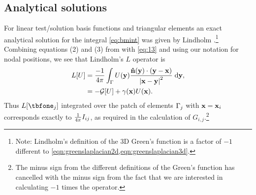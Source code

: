 \subsection{Analytical solutions}

\newcommand{\svu}{\unitv{s}}
\newcommand{\rvu}{\unitv{r}}

For linear test/solution basis functions and triangular elements an exact analytical solution for the integral \cref{eq:bmint} was given by Lindholm \cite[App. B]{Lindholm1984}.\footnote{Note: Lindholm's definition of the 3D Green's function is a factor of $-1$ different to \cref{eqn:greenslaplacian2d,eqn:greenslaplacian3d}.}
Combining equations (2) and (3) from \cite{Lindholm1984} with \cref{eq:13} and using our notation for nodal positions, we see that Lindholm's $L$ operator is
\begin{equation}
  \begin{aligned}
    L[U] &= \frac{-1}{4 \pi}\int_{\Gamma} U(\boldsymbol{\mathrm{y}}) \frac{\boldsymbol{\mathrm{\hat{n}}}(\boldsymbol{\mathrm{y}}) \cdot (\boldsymbol{\mathrm{y}} -
      \boldsymbol{\mathrm{x}})}{\left|{\boldsymbol{\mathrm{x}} - \boldsymbol{\mathrm{y}}} \right|^2}
    {\; \mathrm{{d}}}\boldsymbol{\mathrm{y}}, \\
    &= -\mathcal{G}[U] + \gamma(\boldsymbol{\mathrm{x}}) U(\boldsymbol{\mathrm{x}}).
  \end{aligned}
\end{equation}
Thus $L[\tbfone_{\ibasisb}]$ integrated over the patch of elements ${\Gamma}_{j}$ with $\boldsymbol{\mathrm{x}} = \boldsymbol{\mathrm{x}}_{i}$ corresponds exactly to $\frac{1}{4\pi}I_{ij}$, as required in the calculation of $G_{i,j}$.\footnote{The minus sign from the different definitions of the Green's function has cancelled with the minus sign from the fact that we are interested in calculating $-1$ times the operator.}


